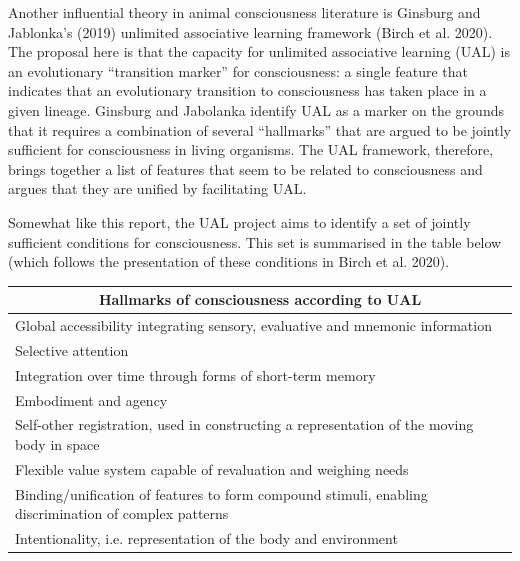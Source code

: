 \documentclass[12pt]{article}
\begin{document}
Another influential theory in animal consciousness literature is Ginsburg and Jablonka’s (2019) unlimited associative learning framework (Birch et al. 2020). The proposal here is that the capacity for unlimited associative learning (UAL) is an evolutionary ``transition marker'' for consciousness: a single feature that indicates that an evolutionary transition to consciousness has taken place in a given lineage. Ginsburg and Jabolanka identify UAL as a marker on the grounds that it requires a combination of several ``hallmarks'' that are argued to be jointly sufficient for consciousness in living organisms. The UAL framework, therefore, brings together a list of features that seem to be related to consciousness and argues that they are unified by facilitating UAL.

Somewhat like this report, the UAL project aims to identify a set of jointly sufficient conditions for consciousness. This set is summarised in the table below (which follows the presentation of these conditions in Birch et al. 2020).

\begin{center} %
\begin{tabular}{|p{}|} %
\hline
\multicolumn{1}{|c|}{\textbf{Hallmarks of consciousness according to UAL}} \\ %
\hline
\rowcolor{lightgray1} Global accessibility integrating sensory, evaluative and mnemonic information  \\
\hline
\rowcolor{lightgray2} Selective attention \\
\hline
\rowcolor{lightgray1} Integration over time through forms of short-term memory \\
\hline
\rowcolor{lightgray2} Embodiment and agency \\
\hline
\rowcolor{lightgray1} Self-other registration, used in constructing a representation of the moving body in space \\
\hline
\rowcolor{lightgray2} Flexible value system capable of revaluation and weighing needs \\
\hline
\rowcolor{lightgray1} Binding/unification of features to form compound stimuli, enabling discrimination of complex patterns \\
\hline
\rowcolor{lightgray2} Intentionality, i.e. representation of the body and environment \\
\hline
\end{tabular}
\end{center}
\end{document}
